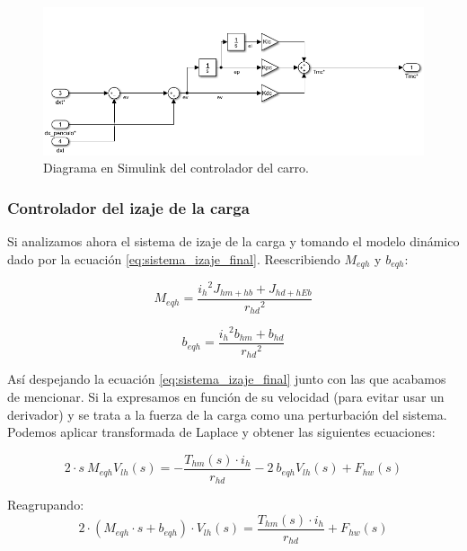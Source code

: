 \documentclass[11pt]{article}
\begin{document}
\begin{figure}[h!]
	\centering
	\includegraphics[width=1\textwidth]{images/imagen_12_controlador_carro.png}
	\caption{Diagrama en Simulink del controlador del carro.}
	\label{fig:controlador_carro_simulink}
\end{figure}


\subsubsection{Controlador del izaje de la carga}

Si analizamos ahora el sistema de izaje de la carga y tomando el modelo dinámico dado por la ecuación \ref{eq:sistema_izaje_final}. Reescribiendo $M_{eqh}$ y $b_{eqh}$:

\begin{equation}
	\label{eq:sistema_izaje_masa_equivalente}
	M_{eqh} = \frac{{i_{h}}^{2}J_{hm+hb}+J_{hd+hEb}}{{r_{hd}}^{2}}
\end{equation}

\begin{equation}
	\label{eq:sistema_izaje_friccion_equivalente}
	b_{eqh} = \frac{{i_{h}}^{2}b_{hm}+b_{hd}}{{r_{hd}}^{2}}
\end{equation}

Así despejando la ecuación \ref{eq:sistema_izaje_final} junto con las que acabamos de mencionar. Si la expresamos en función de su velocidad (para evitar usar un derivador) y se trata a la fuerza de la carga como una perturbación del sistema. Podemos aplicar transformada de Laplace y obtener las siguientes ecuaciones:

\begin{equation}
	\label{eq:sistema_izaje_simplificado_laplace}
	2\cdot s\ M_{eqh} V_{lh}(s)=-\frac{ T_{hm}(s)\cdot i_{h}}{r_{hd}}-2\ b_{eqh} V_{lh}(s)+F_{hw}(s)
\end{equation}

Reagrupando:
\begin{equation}
	\label{eq:sistema_izaje_simplificado_laplace_reordenado}
	2\cdot \left ( M_{eqh}\cdot s+b_{eqh} \right )\cdot V_{lh}(s) = \frac{T_{hm}(s)\cdot i_{h}}{r_{hd}}+ F_{hw}(s)
\end{equation}
\end{document}
